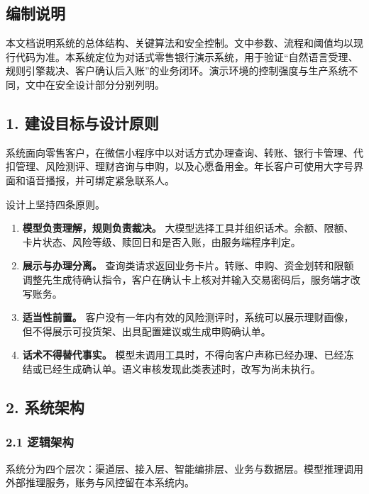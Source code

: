 \documentclass[
  a4paper,
  zihao=5,
  fontset=none]{ctexart}
\providecommand{\tightlist}{%
  \setlength{\itemsep}{0pt}\setlength{\parskip}{0pt}}
\begin{document}
\subsection{编制说明}\label{ux7f16ux5236ux8bf4ux660e}

本文档说明系统的总体结构、关键算法和安全控制。文中参数、流程和阈值均以现行代码为准。本系统定位为对话式零售银行演示系统，用于验证``自然语言受理、规则引擎裁决、客户确认后入账''的业务闭环。演示环境的控制强度与生产系统不同，文中在安全设计部分分别列明。

\subsection{1.
建设目标与设计原则}\label{ux5efaux8bbeux76eeux6807ux4e0eux8bbeux8ba1ux539fux5219}

系统面向零售客户，在微信小程序中以对话方式办理查询、转账、银行卡管理、代扣管理、风险测评、理财咨询与申购，以及心愿备用金。年长客户可使用大字号界面和语音播报，并可绑定紧急联系人。

设计上坚持四条原则。

\begin{enumerate}
\def\labelenumi{\arabic{enumi}.}
\tightlist
\item
  \textbf{模型负责理解，规则负责裁决。}
  大模型选择工具并组织话术。余额、限额、卡片状态、风险等级、赎回日和是否入账，由服务端程序判定。
\item
  \textbf{展示与办理分离。}
  查询类请求返回业务卡片。转账、申购、资金划转和限额调整先生成待确认指令，客户在确认卡上核对并输入交易密码后，服务端才改写账务。
\item
  \textbf{适当性前置。}
  客户没有一年内有效的风险测评时，系统可以展示理财画像，但不得展示可投货架、出具配置建议或生成申购确认单。
\item
  \textbf{话术不得替代事实。}
  模型未调用工具时，不得向客户声称已经办理、已经冻结或已经生成确认单。语义审核发现此类表述时，改写为尚未执行。
\end{enumerate}

\subsection{2. 系统架构}\label{ux7cfbux7edfux67b6ux6784}

\subsubsection{2.1 逻辑架构}\label{ux903bux8f91ux67b6ux6784}

系统分为四个层次：渠道层、接入层、智能编排层、业务与数据层。模型推理调用外部推理服务，账务与风控留在本系统内。
\end{document}
